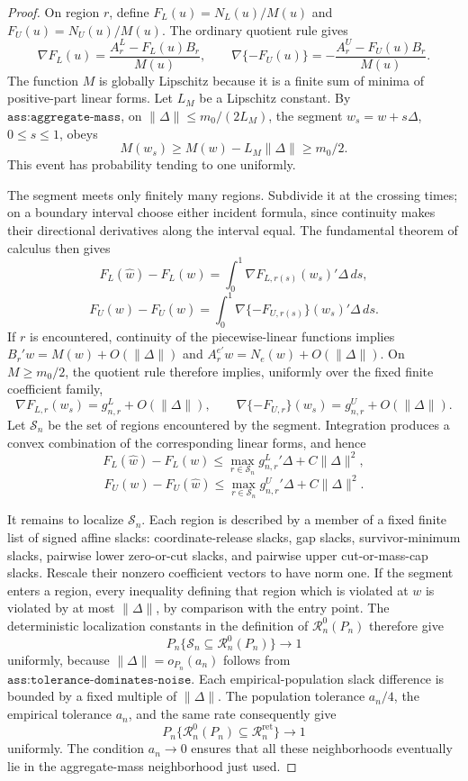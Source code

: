 \documentclass{article}
\begin{document}
\begin{proof}
On region \(r\), define \(F_L(u)=N_L(u)/M(u)\) and \(F_U(u)=N_U(u)/M(u)\). The ordinary quotient rule gives
\[
 \nabla F_L(u)=\frac{A_r^L-F_L(u)B_r}{M(u)},
 \qquad
 \nabla\{-F_U(u)\}=-\frac{A_r^U-F_U(u)B_r}{M(u)}.
\]
The function \(M\) is globally Lipschitz because it is a finite sum of minima of positive-part linear forms. Let \(L_M\) be a Lipschitz constant. By \(\texttt{ass:aggregate-mass}\), on
\(\lVert\Delta\rVert\le m_0/(2L_M)\), the segment \(w_s=w+s\Delta\), \(0\le s\le1\), obeys
\[
 M(w_s)\ge M(w)-L_M\lVert\Delta\rVert\ge m_0/2.
\]
This event has probability tending to one uniformly.

The segment meets only finitely many regions. Subdivide it at the crossing times; on a boundary interval choose either incident formula, since continuity makes their directional derivatives along the interval equal. The fundamental theorem of calculus then gives
\[
 F_L(\widehat w)-F_L(w)
 =\int_0^1\nabla F_{L,r(s)}(w_s)'\Delta\,ds,
\]
\[
 F_U(w)-F_U(\widehat w)
 =\int_0^1\nabla\{-F_{U,r(s)}\}(w_s)'\Delta\,ds.
\]
If \(r\) is encountered, continuity of the piecewise-linear functions implies
\(B_r'w=M(w)+O(\lVert\Delta\rVert)\) and
\(A_r^{e\prime}w=N_e(w)+O(\lVert\Delta\rVert)\). On \(M\ge m_0/2\), the quotient rule therefore implies, uniformly over the fixed finite coefficient family,
\[
 \nabla F_{L,r}(w_s)=g^L_{n,r}+O(\lVert\Delta\rVert),
 \qquad
 \nabla\{-F_{U,r}\}(w_s)=g^U_{n,r}+O(\lVert\Delta\rVert).
\]
Let \(\mathcal S_n\) be the set of regions encountered by the segment. Integration produces a convex combination of the corresponding linear forms, and hence
\[
 F_L(\widehat w)-F_L(w)
 \le\max_{r\in\mathcal S_n}g^L_{n,r}{}'\Delta+C\lVert\Delta\rVert^2,
\]
\[
 F_U(w)-F_U(\widehat w)
 \le\max_{r\in\mathcal S_n}g^U_{n,r}{}'\Delta+C\lVert\Delta\rVert^2.
\]

It remains to localize \(\mathcal S_n\). Each region is described by a member of a fixed finite list of signed affine slacks: coordinate-release slacks, gap slacks, survivor-minimum slacks, pairwise lower zero-or-cut slacks, and pairwise upper cut-or-mass-cap slacks. Rescale their nonzero coefficient vectors to have norm one. If the segment enters a region, every inequality defining that region which is violated at \(w\) is violated by at most \(\lVert\Delta\rVert\), by comparison with the entry point. The deterministic localization constants in the definition of \(\mathcal R_n^0(P_n)\) therefore give
\[
 P_n\{\mathcal S_n\subseteq\mathcal R_n^0(P_n)\}\longrightarrow1
\]
uniformly, because \(\lVert\Delta\rVert=o_{P_n}(a_n)\) follows from \(\texttt{ass:tolerance-dominates-noise}\). Each empirical-population slack difference is bounded by a fixed multiple of \(\lVert\Delta\rVert\). The population tolerance \(a_n/4\), the empirical tolerance \(a_n\), and the same rate consequently give
\[
 P_n\{\mathcal R_n^0(P_n)\subseteq\mathcal R_n^{\mathrm{ret}}\}
 \longrightarrow1
\]
uniformly. The condition \(a_n\to0\) ensures that all these neighborhoods eventually lie in the aggregate-mass neighborhood just used.


\end{proof}
\end{document}
